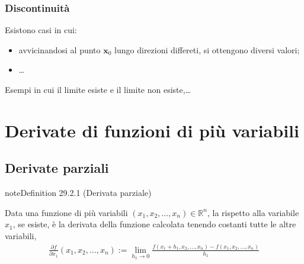 \documentclass[letterpaper,10pt,italian]{jupyterBook}
\begin{document}
\subsubsection{Discontinuità}
\label{\detokenize{ch/multivariable-calculus/limits:discontinuita}}\label{\detokenize{ch/multivariable-calculus/limits:multivariable-calculus-discontinuity}}
\sphinxAtStartPar
Esistono casi in cui:
\begin{itemize}
\item {} 
\sphinxAtStartPar
avvicinandosi al punto \(\mathbf{x}_0\) lungo direzioni differeti, si ottengono diversi valori; 

\item {} 
\sphinxAtStartPar
…

\end{itemize}

\sphinxAtStartPar
{} Esempi in cui il limite esiste e il limite non esiste,…



\sphinxstepscope


\section{Derivate di funzioni di più variabili}
\label{\detokenize{ch/multivariable-calculus/derivatives:derivate-di-funzioni-di-piu-variabili}}\label{\detokenize{ch/multivariable-calculus/derivatives:multivariable-calculus-derivatives}}\label{\detokenize{ch/multivariable-calculus/derivatives::doc}}

\subsection{Derivate parziali}
\label{\detokenize{ch/multivariable-calculus/derivatives:derivate-parziali}}\label{\detokenize{ch/multivariable-calculus/derivatives:multivariable-calculus-derivatives-partial}}\label{ch/multivariable-calculus/derivatives:multivariable-calculus-partial-derivative}
\begin{sphinxadmonition}{note}{Definition 29.2.1 (Derivata parziale)}



\sphinxAtStartPar
Data una funzione di più variabili \((x_1, x_2, \dots, x_n) \in \mathbb{R}^n\), la  rispetto alla variabile \(x_1\), se esiste, è la derivata della funzione calcolata tenendo costanti tutte le altre variabili,
\begin{equation*}
\begin{split}\frac{\partial f}{\partial x_1}(x_1, x_2, \dots, x_n) := \lim_{h_1 \rightarrow 0} \frac{f(x_1+h_1, x_2, \dots, x_n) - f(x_1, x_2, \dots, x_n)}{h_1}\end{split}
\end{equation*}\end{sphinxadmonition}
\end{document}
